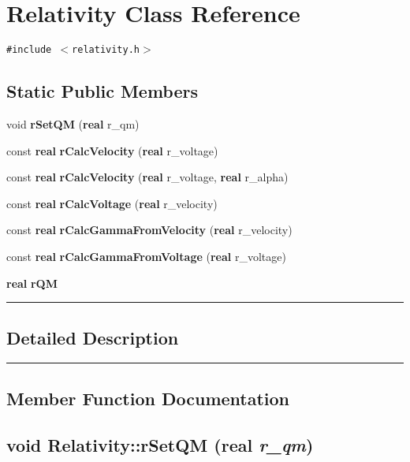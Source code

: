 \section{Relativity  Class Reference}
\label{Relativity}


{\tt \#include $<$relativity.h$>$}

\subsection*{Static Public Members}
\begin{CompactItemize}
\item 
void {\bf r\-Set\-QM} ({\bf real} r\_\-qm)
\item 
const {\bf real} {\bf r\-Calc\-Velocity} ({\bf real} r\_\-voltage)
\item 
const {\bf real} {\bf r\-Calc\-Velocity} ({\bf real} r\_\-voltage, {\bf real} r\_\-alpha)
\item 
const {\bf real} {\bf r\-Calc\-Voltage} ({\bf real} r\_\-velocity)
\item 
const {\bf real} {\bf r\-Calc\-Gamma\-From\-Velocity} ({\bf real} r\_\-velocity)
\item 
const {\bf real} {\bf r\-Calc\-Gamma\-From\-Voltage} ({\bf real} r\_\-voltage)
\item 
{\bf real} {\bf r\-QM}
\end{CompactItemize}
\vspace{0.4cm}\hrule\vspace{0.2cm}
\subsection*{Detailed Description}
\vspace{0.4cm}\hrule\vspace{0.2cm}
\subsection*{Member Function Documentation}
\label{Relativity_d0}
\subsection{\setlength{\rightskip}{0pt plus 5cm}void Relativity::r\-Set\-QM ({\bf real} {\em r\_\-qm})\hspace{0.3cm}{\tt  [inline, static]}}

